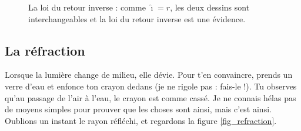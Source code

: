 \begin{figure}[ht]
\centering
{}						%
\caption{La loi du retour inverse : comme $\hat\imath=\hat r$, les deux dessins sont interchangeables et la loi du retour inverse est une évidence.}\label{fig_retourinverse}
\end{figure}

\subsection{La réfraction}

Lorsque la lumière change de milieu, elle dévie. Pour t'en convaincre, prends un verre d'eau et enfonce ton crayon dedans (je ne rigole pas : fais-le !). Tu observes qu'au passage de l'air à l'eau, le crayon est comme \og cassé\fg. Je ne connais hélas pas de moyens simples pour prouver que les choses sont ainsi, mais c'est ainsi. Oublions un instant le rayon réfléchi, et regardons la figure \ref{fig_refraction}.


\newcommand{\prefigrefraction}{%
\pstGeonode(0,0){O}(2,0){P}
\pstRotation[RotAngle=90]{O}{P}[Qi]
\pstHomO[HomCoef=0.5]{O}{Qi}[Q]
\pstRotation[RotAngle=180]{O}{P}[R]
\pstHomO[HomCoef=-1]{O}{Q}[S]
\pstRotation[RotAngle=-20]{O}{R}[Ri]		%
    \pstDioptre{O}{P}{Ri}{0.9}{2}{Rs}{Re}	%
}

